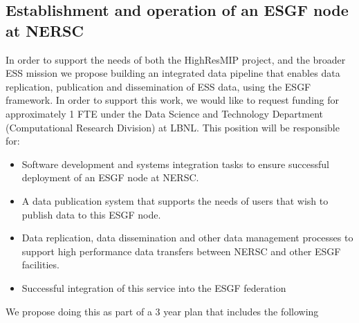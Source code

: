 \documentclass[11pt]{article}
\begin{document}
\subsection{Establishment and operation of an ESGF node at NERSC}
\label{ssec:ESGF}

In order to support the needs of both the HighResMIP project, and the broader ESS mission we propose building an integrated data pipeline that enables data replication, publication and dissemination of ESS data, using the ESGF framework. In order to support this work, we would like to request funding for approximately 1 FTE under the Data Science and Technology Department (Computational Research Division) at LBNL. 
This position will be responsible for:
\begin{itemize}
\item Software development and systems integration tasks to ensure successful deployment of an ESGF node at NERSC. 
\item A data publication system that supports the needs of users that wish to publish data to this ESGF node.
\item Data replication, data dissemination and other data management processes to support high performance data transfers between NERSC and other ESGF facilities.
\item Successful integration of this service into the ESGF federation
\end{itemize}
We propose doing this as part of a 3 year plan that includes the following 

\vspace*{0.25truecm}
\end{document}
